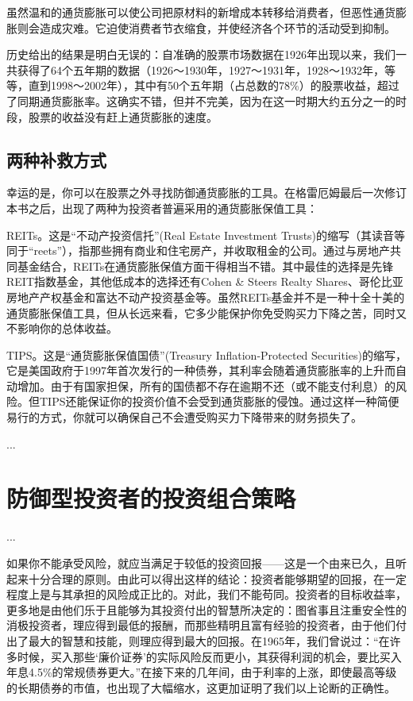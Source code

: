 \documentclass[12pt,oneside]{book}
\begin{document}
虽然温和的通货膨胀可以使公司把原材料的新增成本转移给消费者，但恶性通货膨胀则会造成灾难。它迫使消费者节衣缩食，并使经济各个环节的活动受到抑制。

历史给出的结果是明白无误的：自准确的股票市场数据在1926年出现以来，我们一共获得了64个五年期的数据（1926～1930年，1927～1931年，1928～1932年，等等，直到1998～2002年），其中有50个五年期（占总数的78\%）的股票收益，超过了同期通货膨胀率。这确实不错，但并不完美，因为在这一时期大约五分之一的时段，股票的收益没有赶上通货膨胀的速度。

\subsection{两种补救方式}
幸运的是，你可以在股票之外寻找防御通货膨胀的工具。在格雷厄姆最后一次修订本书之后，出现了两种为投资者普遍采用的通货膨胀保值工具：

REITs。这是“不动产投资信托”(Real Estate Investment Trusts)的缩写（其读音等同于“reets”），指那些拥有商业和住宅房产，并收取租金的公司。通过与房地产共同基金结合，REITs在通货膨胀保值方面干得相当不错。其中最佳的选择是先锋REIT指数基金，其他低成本的选择还有Cohen \& Steers Realty Shares、哥伦比亚房地产产权基金和富达不动产投资基金等。虽然REITs基金并不是一种十全十美的通货膨胀保值工具，但从长远来看，它多少能保护你免受购买力下降之苦，同时又不影响你的总体收益。

TIPS。这是“通货膨胀保值国债”(Treasury Inflation-Protected Securities)的缩写，它是美国政府于1997年首次发行的一种债券，其利率会随着通货膨胀率的上升而自动增加。由于有国家担保，所有的国债都不存在逾期不还（或不能支付利息）的风险。但TIPS还能保证你的投资价值不会受到通货膨胀的侵蚀。通过这样一种简便易行的方式，你就可以确保自己不会遭受购买力下降带来的财务损失了。

...

\section{防御型投资者的投资组合策略}
...

如果你不能承受风险，就应当满足于较低的投资回报——这是一个由来已久，且听起来十分合理的原则。由此可以得出这样的结论：投资者能够期望的回报，在一定程度上是与其承担的风险成正比的。对此，我们不能苟同。投资者的目标收益率，更多地是由他们乐于且能够为其投资付出的智慧所决定的：图省事且注重安全性的消极投资者，理应得到最低的报酬，而那些精明且富有经验的投资者，由于他们付出了最大的智慧和技能，则理应得到最大的回报。在1965年，我们曾说过：“在许多时候，买入那些‘廉价证券’的实际风险反而更小，其获得利润的机会，要比买入年息4.5\%的常规债券更大。”在接下来的几年间，由于利率的上涨，即使最高等级的长期债券的市值，也出现了大幅缩水，这更加证明了我们以上论断的正确性。
\end{document}
